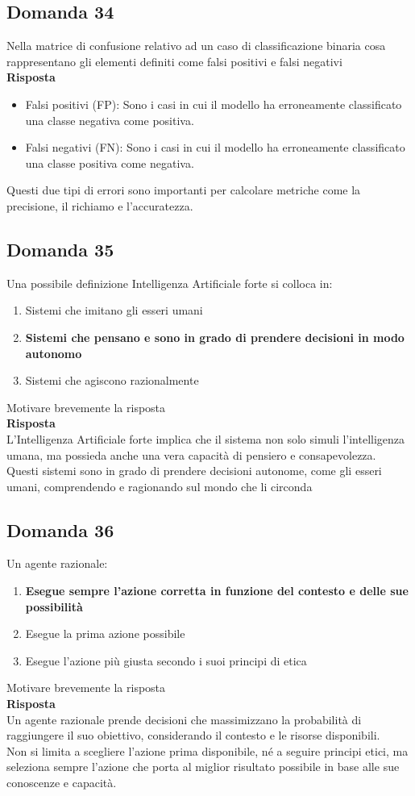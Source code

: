\documentclass[../main.tex]{subfiles}
\begin{document}
	\subsection{Domanda 34}
	Nella matrice di confusione relativo ad un caso di classificazione binaria cosa rappresentano gli elementi definiti come falsi positivi e falsi negativi\\
	\textbf{Risposta}
	\begin{itemize}
		\item Falsi positivi (FP): Sono i casi in cui il modello ha erroneamente classificato una classe negativa come positiva.
		\item Falsi negativi (FN): Sono i casi in cui il modello ha erroneamente classificato una classe positiva come negativa.
	\end{itemize}
	Questi due tipi di errori sono importanti per calcolare metriche come la precisione, il richiamo e l'accuratezza.
	\subsection{Domanda 35}
	Una possibile definizione Intelligenza Artificiale forte si colloca in:
	\begin{enumerate}
		\item Sistemi che imitano gli esseri umani 
		\item \textbf{Sistemi che pensano e sono in grado di prendere decisioni in modo autonomo}
		\item Sistemi che agiscono razionalmente
	\end{enumerate}
	Motivare brevemente la risposta\\
	\textbf{Risposta}\\
	L'Intelligenza Artificiale forte implica che il sistema non solo simuli l'intelligenza umana, ma possieda anche una vera capacità di pensiero e consapevolezza.\\
	Questi sistemi sono in grado di prendere decisioni autonome, come gli esseri umani, comprendendo e ragionando sul mondo che li circonda
	\subsection{Domanda 36}
	Un agente razionale:
	\begin{enumerate}
		\item \textbf{Esegue sempre l’azione corretta in funzione del contesto e delle sue possibilità}
		\item Esegue la prima azione possibile 
		\item Esegue l’azione più giusta secondo i suoi principi di etica 
	\end{enumerate}
	Motivare brevemente la risposta\\
	\textbf{Risposta}\\
	Un agente razionale prende decisioni che massimizzano la probabilità di raggiungere il suo obiettivo, considerando il contesto e le risorse disponibili.\\
	Non si limita a scegliere l'azione prima disponibile, né a seguire principi etici, ma seleziona sempre l'azione che porta al miglior risultato possibile in base alle sue conoscenze e capacità.
\end{document}

